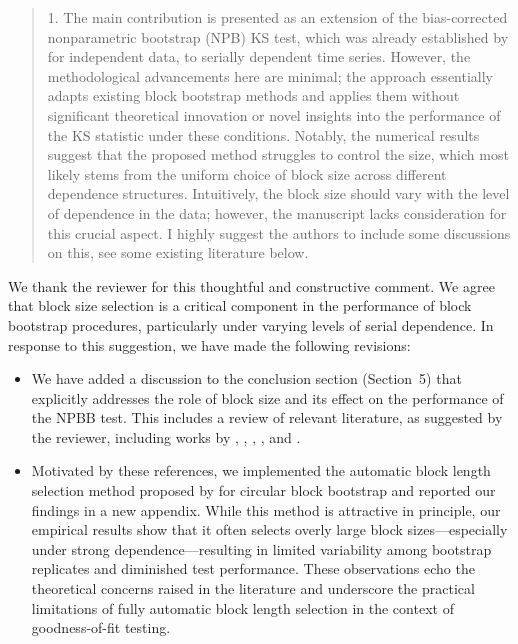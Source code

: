 \documentclass[12pt]{article}
\newenvironment{comment}%
{\begin{quotation}\noindent\small\it\color{darkblue}\ignorespaces%
}{\end{quotation}}
\begin{document}
\begin{comment}
1. The main contribution is presented as an extension of the bias-corrected 
nonparametric bootstrap (NPB) KS test, which was already established by 
\citet{babu2004goodness}
for independent data, to serially dependent time series. However, the 
methodological advancements
here are minimal; the approach essentially adapts existing block bootstrap 
methods and applies them without significant theoretical innovation or novel 
insights into the performance
of the KS statistic under these conditions. Notably, the numerical results 
suggest that the
proposed method struggles to control the size, which most likely stems from the 
uniform
choice of block size across different dependence structures. Intuitively, the 
block size should
vary with the level of dependence in the data; however, the manuscript lacks 
consideration
for this crucial aspect. I highly suggest the authors to include some 
discussions on this, see
some existing literature below.

\citet{hall1995blocking}

\citet{lahiri1999theoretical}

\citet{buhlmann2002bootstraps}

\citet{politis2004automatic}

\citet{lahiri2013resampling}

\end{comment}

We thank the reviewer for this thoughtful and constructive comment. 
We agree that block size selection is a critical component in the 
performance of block bootstrap procedures, particularly under varying 
levels of serial dependence. In response to this suggestion, we have 
made the following revisions:

\begin{itemize}
\item We have added a discussion to the conclusion section (Section~5) 
that explicitly addresses the role of block size and its effect on the 
performance of the NPBB test. This includes a review of relevant literature, 
as suggested by the reviewer, including works by 
\citet{hall1995blocking}, \citet{lahiri1999theoretical}, 
\citet{buhlmann2002bootstraps}, \citet{politis2004automatic}, and 
\citet{lahiri2013resampling}.

\item Motivated by these references, we implemented the automatic block 
length selection method proposed by \citet{politis2004automatic} for 
circular block bootstrap and reported our findings in a new appendix. 
While this method is attractive in principle, our empirical results show 
that it often selects overly large block sizes---especially under strong 
dependence---resulting in limited variability among bootstrap replicates 
and diminished test performance. These observations echo the theoretical 
concerns raised in the literature and underscore the practical limitations 
of fully automatic block length selection in the context of 
goodness-of-fit testing.
\end{itemize}
\end{document}

